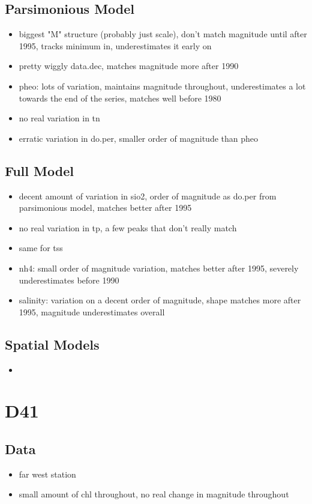 \documentclass[12pt]{amsart}
\begin{document}
\subsection{Parsimonious Model}
\begin{itemize}
\item biggest "M" structure (probably just scale), don't match magnitude until after 1995, tracks minimum in, underestimates it early on
\item pretty wiggly data.dec, matches magnitude more after 1990
\item pheo: lots of variation, maintains magnitude throughout, underestimates a lot towards the end of the series, matches well before 1980
\item no real variation in tn
\item erratic variation in do.per, smaller order of magnitude than pheo
\end{itemize}

\subsection{Full Model}
\begin{itemize}
\item decent amount of variation in sio2, order of magnitude as do.per from parsimonious model, matches better after 1995
\item no real variation in tp, a few peaks that don't really match
\item same for tss
\item nh4: small order of magnitude variation, matches better after 1995, severely underestimates before 1990
\item salinity: variation on a decent order of magnitude, shape matches more after 1995, magnitude underestimates overall
\end{itemize}

\subsection{Spatial Models}

\begin{itemize}
\item 
\end{itemize}


\section{D41}
\subsection{Data}
\begin{itemize}
\item far west station
\item small amount of chl throughout, no real change in magnitude throughout

\end{itemize}
\end{document}
